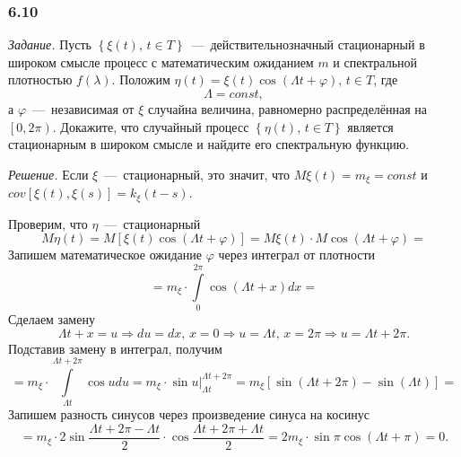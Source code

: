 \subsubsection*{6.10}

\textit{Задание.}
Пусть $ \left\{ \xi \left( t \right), \, t \in T \right\} $~---~действительнозначный
стационарный в широком смысле процесс с математическим ожиданием $m$ и спектральной плотностью
$f \left( \lambda \right) $.
Положим
$ \eta \left( t \right) = \xi \left( t \right) \cos \left( \Lambda t + \varphi \right), \,
  t \in T$,
где
\begin{equation*}
  \Lambda =
  const,
\end{equation*}
а $\varphi$~---~независимая от $ \xi $ случайна величина,
равномерно распределённая на $ \left[ 0, 2 \pi \right) $.
Докажите, что случайный процесс $ \left\{ \eta \left( t \right), \, t \in T \right\} $
является стационарным в широком смысле и найдите его спектральную функцию.

\textit{Решение.}
Если $ \xi $~---~стационарный, это значит,
что $M \xi \left( t \right) = m_{ \xi } = const$ и
$cov \left[ \xi \left( t \right), \xi \left( s \right) \right] =
  k_{ \xi } \left( t - s \right) $.

Проверим, что $ \eta $~---~стационарный
\begin{equation*}
  M \eta \left( t \right) =
  M \left[ \xi \left( t \right) \cos \left( \Lambda t + \varphi \right) \right] =
  M \xi \left( t \right) \cdot M \cos \left( \Lambda t + \varphi \right) =
\end{equation*}
Запишем математическое ожидание $ \varphi $ через интеграл от плотности
\begin{equation*}
  = m_{ \xi } \cdot \int \limits_0^{2 \pi } \cos \left( \Lambda t + x \right) dx =
\end{equation*}
Сделаем замену
\begin{equation*}
  \Lambda t + x = u \Rightarrow du = dx, \,
  x = 0 \Rightarrow u = \Lambda t, \,
  x = 2 \pi \Rightarrow u = \Lambda t + 2 \pi.
\end{equation*}
Подставив замену в интеграл, получим
\begin{equation*}
  = m_{ \xi } \cdot \int \limits_{ \Lambda t}^{ \Lambda t + 2 \pi } \cos u du =
  m_{ \xi } \cdot \left. \sin u \right|_{ \Lambda t}^{ \Lambda t + 2 \pi } =
  m_{ \xi } \left[ \sin \left( \Lambda t + 2 \pi \right) - \sin \left( \Lambda t \right) \right] =
\end{equation*}
Запишем разность синусов через произведение синуса на косинус
\begin{equation*}
  = m_{ \xi } \cdot 2 \sin \frac{ \Lambda t + 2 \pi - \Lambda t}{2} \cdot
  \cos \frac{ \Lambda t + 2 \pi + \Lambda t}{2} =
  2m_{ \xi } \cdot \sin \pi \cos \left( \Lambda t + \pi \right) =
  0.
\end{equation*}

